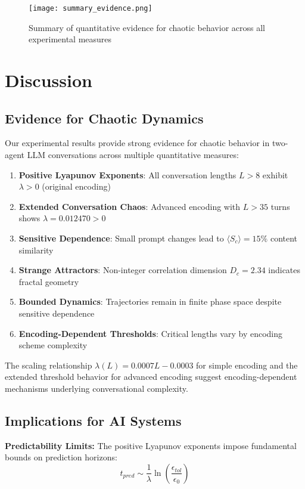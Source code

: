 \documentclass[11pt,a4paper]{article}
\begin{document}
\begin{figure}[ht]
\centering
\texttt{[image: summary\_evidence.png]}
\caption{Summary of quantitative evidence for chaotic behavior across all experimental measures}
\label{fig:summary}
\end{figure}

\section{Discussion}

\subsection{Evidence for Chaotic Dynamics}

Our experimental results provide strong evidence for chaotic behavior in two-agent LLM conversations across multiple quantitative measures:

\begin{enumerate}
    \item \textbf{Positive Lyapunov Exponents}: All conversation lengths $L > 8$ exhibit $\lambda > 0$ (original encoding)
    \item \textbf{Extended Conversation Chaos}: Advanced encoding with $L > 35$ turns shows $\lambda = 0.012470 > 0$
    \item \textbf{Sensitive Dependence}: Small prompt changes lead to $\langle S_c \rangle = 15\%$ content similarity
    \item \textbf{Strange Attractors}: Non-integer correlation dimension $D_c = 2.34$ indicates fractal geometry
    \item \textbf{Bounded Dynamics}: Trajectories remain in finite phase space despite sensitive dependence
    \item \textbf{Encoding-Dependent Thresholds}: Critical lengths vary by encoding scheme complexity
\end{enumerate}

The scaling relationship $\lambda(L) = 0.0007L - 0.0003$ for simple encoding and the extended threshold behavior for advanced encoding suggest encoding-dependent mechanisms underlying conversational complexity.

\subsection{Implications for AI Systems}

\textbf{Predictability Limits:}
The positive Lyapunov exponents impose fundamental bounds on prediction horizons:
\begin{equation}
t_{pred} \sim \frac{1}{\lambda} \ln\left(\frac{\epsilon_{tol}}{\epsilon_0}\right)
\end{equation}
\end{document}
